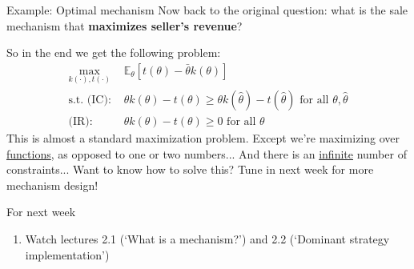 \documentclass[english,10pt
,aspectratio=169
]{beamer}
\begin{document}
\begin{frame}{Example: Optimal mechanism}
	Now back to the original question: what is the sale mechanism that \textbf{maximizes seller's revenue}?
	
	So in the end we get the following problem:
	\begin{align*}
		\max_{k(\cdot),t(\cdot)} & \mathbb{E}_\theta \left[ t(\theta) - \bar{\theta} k(\theta) \right]
		\\
		\text{s.t. (IC): } & \theta k(\theta) - t(\theta) \geq \theta k(\hat{\theta}) - t(\hat{\theta}) \text{ for all } \theta,\hat{\theta}
		\\
		\text{(IR): } &\theta k(\theta) - t(\theta) \geq 0 \text{ for all } \theta
	\end{align*}
	\pause
	This is almost a standard maximization problem. Except we're maximizing over \uline{functions}, as opposed to one or two numbers... And there is an \uline{infinite} number of constraints...
	\pause
	Want to know how to solve this? Tune in next week for more mechanism design!
\end{frame}


\begin{frame}{For next week}
	\begin{enumerate}
		\item Watch lectures 2.1 (`What is a mechanism?') and 2.2 (`Dominant strategy implementation')
	\end{enumerate}
\end{frame}
\end{document}
